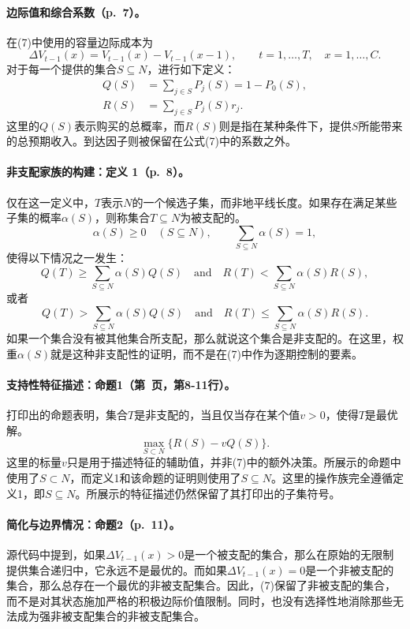 \documentclass{article}
\begin{document}
\paragraph{边际值和综合系数（p.~7）。}
在(7)中使用的容量边际成本为
\[
\Delta V_{t-1}(x)=V_{t-1}(x)-V_{t-1}(x-1),
\qquad t=1,\ldots,T,\quad x=1,\ldots,C.
\]
对于每一个提供的集合$S\subseteq N$，进行如下定义：
\begin{align*}
Q(S)&=\sum_{j\in S}P_j(S)=1-P_0(S),\\
R(S)&=\sum_{j\in S}P_j(S)r_j.
\end{align*}
这里的$Q(S)$表示购买的总概率，而$R(S)$则是指在某种条件下，提供$S$所能带来的总预期收入。到达因子则被保留在公式(7)中的系数之外。

\paragraph{非支配家族的构建：定义 1（p.~8）。}
仅在这一定义中，$T$表示$N$的一个候选子集，而非地平线长度。如果存在满足某些子集的概率$\alpha(S)$，则称集合$T\subseteq N$为被支配的。
\[
\alpha(S)\ge0\quad(S\subseteq N),
\qquad \sum_{S\subseteq N}\alpha(S)=1,
\]
使得以下情况之一发生：
\[
Q(T)\ge\sum_{S\subseteq N}\alpha(S)Q(S)
\quad\text{and}\quad
R(T)<\sum_{S\subseteq N}\alpha(S)R(S),
\]
或者
\[
Q(T)>\sum_{S\subseteq N}\alpha(S)Q(S)
\quad\text{and}\quad
R(T)\le\sum_{S\subseteq N}\alpha(S)R(S).
\]
如果一个集合没有被其他集合所支配，那么就说这个集合是非支配的。在这里，权重$\alpha(S)$就是这种非支配性的证明，而不是在(7)中作为逐期控制的要素。

\paragraph{支持性特征描述：命题1（第~页，第8-11行）。}
打印出的命题表明，集合$T$是非支配的，当且仅当存在某个值$v>0$，使得$T$是最优解。
\[
\max_{S\subset N}\{R(S)-vQ(S)\}.
\]
这里的标量$v$只是用于描述特征的辅助值，并非(7)中的额外决策。所展示的命题中使用了$S\subset N$，而定义1和该命题的证明则使用了$S\subseteq N$。这里的操作族完全遵循定义1，即$S\subseteq N$。所展示的特征描述仍然保留了其打印出的子集符号。

\paragraph{简化与边界情况：命题2（p.~11）。}
源代码中提到，如果$\Delta V_{t-1}(x)>0$是一个被支配的集合，那么在原始的无限制提供集合递归中，它永远不是最优的。而如果$\Delta V_{t-1}(x)=0$是一个非被支配的集合，那么总存在一个最优的非被支配集合。因此，(7)保留了非被支配的集合，而不是对其状态施加严格的积极边际价值限制。同时，也没有选择性地消除那些无法成为强非被支配集合的非被支配集合。
\end{document}
